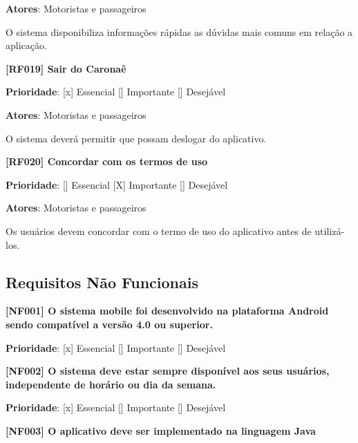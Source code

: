 \textbf{Atores}: Motoristas e passageiros

O sistema disponibiliza informações rápidas as dúvidas mais comuns em relação a aplicação.

\textbf{[RF019] Sair do Caronaê}

\textbf{Prioridade}:      [x] Essencial        [] Importante     [] Desejável 

\textbf{Atores}: Motoristas e passageiros

O sistema deverá permitir que possam deslogar do aplicativo.

\textbf{[RF020] Concordar com os termos de uso} 

\textbf{Prioridade}:      [] Essencial        [X] Importante     [] Desejável 

\textbf{Atores}: Motoristas e passageiros

Os usuários devem concordar com o termo de uso do aplicativo antes de utilizá-los.


\subsection{Requisitos Não Funcionais}

\textbf{[NF001] O sistema mobile foi desenvolvido na plataforma Android sendo compatível a versão 4.0 ou superior. %
}

\textbf{Prioridade}:      [x] Essencial        [] Importante     [] Desejável 



\textbf{[NF002] O sistema deve estar sempre disponível  aos seus usuários, independente de horário ou dia da semana. %
}

\textbf{Prioridade}:      [x] Essencial        [] Importante     [] Desejável 

\textbf{[NF003] O aplicativo deve ser implementado na linguagem Java}


